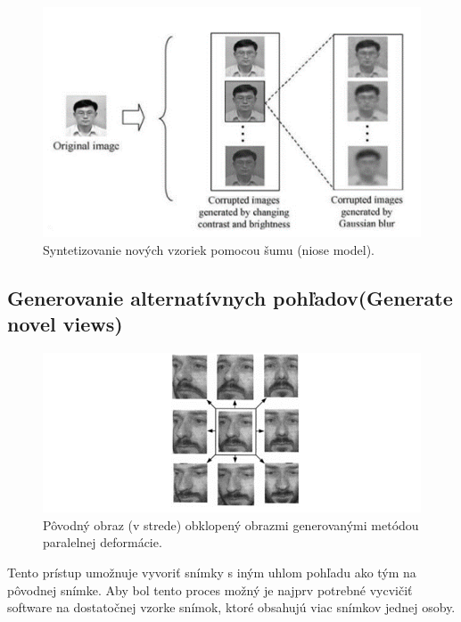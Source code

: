 \documentclass[10pt,twoside,slovak,a4paper]{article}
\begin{document}
\begin{figure}[tbh]
\centering
\includegraphics[width=\textwidth]{Picture1.png}
\caption{Syntetizovanie nových vzoriek pomocou šumu (niose model).\cite{article1}}
\label{f:noise}
\end{figure}

\subsection{Generovanie alternatívnych pohľadov(Generate novel views)} \label{ina:nejake}

\begin{figure}[tbh]
\centering
\includegraphics[width=\textwidth]{Picture2.png}
\caption{Pôvodný obraz (v strede) obklopený obrazmi generovanými metódou paralelnej deformácie.\cite{article1}}
\label{f:multiangle}
\end{figure}

Tento prístup umožnuje vyvoriť snímky s iným uhlom pohľadu ako tým na pôvodnej snímke. Aby bol tento proces možný je najprv potrebné vycvičiť software na dostatočnej vzorke snímok, ktoré obsahujú viac snímkov jednej osoby.\cite{article1}


\end{document}
